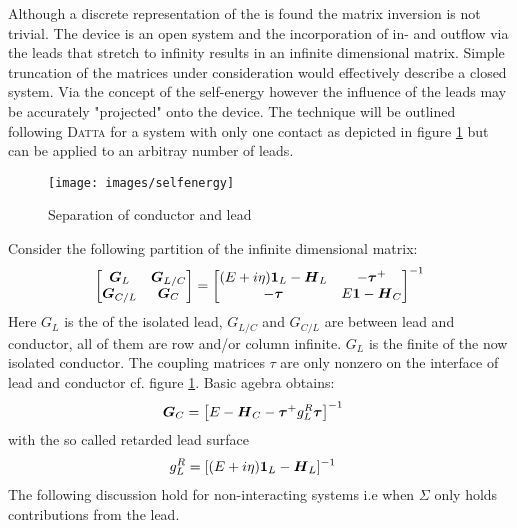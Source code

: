 Although a discrete representation of the \hamil{} is found the matrix inversion is not trivial. The device is an open system and the incorporation of in- and outflow via the leads that stretch to infinity results in an infinite dimensional matrix.
Simple truncation of the matrices under consideration would effectively describe a closed system. Via the concept of the self-energy however the influence of the leads may be accurately "projected" onto the device.
The technique will be outlined following \textsc{Datta} for a system with only one contact as depicted in figure \ref{fig:selfenergy} but can be applied to an arbitray number of leads. \begin{figure}[h!]
\centering
\texttt{[image: images/selfenergy]}
\caption{Separation of conductor and lead}
\label{fig:selfenergy}
\end{figure}

Consider the following partition of the infinite dimensional \gfnc{} matrix:
\begin{align}
  \begin{bmatrix}
  \boldsymbol{G}_{L} & \boldsymbol{G}_{L/C}\\
  \boldsymbol{G}_{C/L} & \boldsymbol{G}_{C}
  \end{bmatrix}
  =
  \begin{bmatrix}
  (E+i\eta)\boldsymbol{1}_{L} - \boldsymbol{H}_L  & -\boldsymbol{\tau}^+ \\
	-\boldsymbol{\tau} & E\boldsymbol{1} - \boldsymbol{H}_C
  \end{bmatrix}^{-1}
  \label{eqn:greendivided}
\end{align}
Here $G_L$ is the \gfnc{} of the isolated lead, $G_{L/C}$ and $G_{C/L}$ are \gfnc{} between lead and conductor, all of them are row and/or column infinite. $G_L$ is the finite \gfnc{} of the now isolated conductor. The coupling matrices $\tau$ are only nonzero on the interface of lead and conductor cf. figure \ref{fig:selfenergy}.
Basic agebra obtains\cite{Datta1997}:
\begin{align}
\boldsymbol{G}_C& = \left[E-\boldsymbol{H}_C - \boldsymbol{\tau}^+ g_L^R \boldsymbol{\tau}\right]^{-1} 
\label{eqn:finitegreensfunction}
\end{align}
with the so called retarded lead surface \gfnc{}
\begin{align}
g_L^R &= [(E+i\eta)\boldsymbol{1}_L - \boldsymbol{H}_L]^{-1}
\label{eqn:leadsurfacegfnc}
\end{align}
The following discussion hold for non-interacting systems i.e  when $\Sigma$ only holds contributions from the lead.

